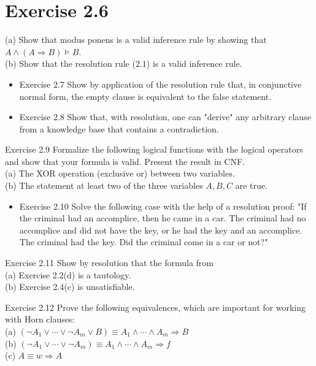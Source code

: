 \documentclass[10pt]{article}
\begin{document}
\section*{Exercise 2.6}
(a) Show that modus ponens is a valid inference rule by showing that $A \wedge(A \Rightarrow B) \models B$.\\

(b) Show that the resolution rule (2.1) is a valid inference rule.

\begin{itemize}
  \item Exercise 2.7 Show by application of the resolution rule that, in conjunctive normal form, the empty clause is equivalent to the false statement.
  \item Exercise 2.8 Show that, with resolution, one can "derive" any arbitrary clause from a knowledge base that contains a contradiction.
\end{itemize}

Exercise 2.9 Formalize the following logical functions with the logical operators and show that your formula is valid. Present the result in CNF.\\
(a) The XOR operation (exclusive or) between two variables.\\
(b) The statement at least two of the three variables $A, B, C$ are true.

\begin{itemize}
  \item Exercise 2.10 Solve the following case with the help of a resolution proof: "If the criminal had an accomplice, then he came in a car. The criminal had no accomplice and did not have the key, or he had the key and an accomplice. The criminal had the key. Did the criminal come in a car or not?"
\end{itemize}

Exercise 2.11 Show by resolution that the formula from\\
(a) Exercise 2.2(d) is a tautology.\\
(b) Exercise 2.4(c) is unsatisfiable.

Exercise 2.12 Prove the following equivalences, which are important for working with Horn clauses:\\
(a) $\left(\neg A_{1} \vee \cdots \vee \neg A_{m} \vee B\right) \equiv A_{1} \wedge \cdots \wedge A_{m} \Rightarrow B$\\
(b) $\left(\neg A_{1} \vee \cdots \vee \neg A_{m}\right) \equiv A_{1} \wedge \cdots \wedge A_{m} \Rightarrow f$\\
(c) $A \equiv w \Rightarrow A$
\end{document}
